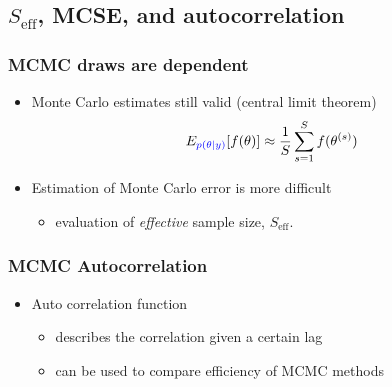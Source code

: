 \documentclass[10pt]{beamer}
\begin{document}
\subsection{$S_\text{eff}$, MCSE, and autocorrelation}


\begin{frame}

\frametitle{MCMC draws are dependent}

  \begin{itemize}
    \item Monte Carlo estimates still valid (central limit theorem)
      \begin{align*}
        E_{\color{blue} p(\theta|y)}[f(\theta)] \approx \frac{1}{S} \sum_{s=1}^S f(\theta^{(s)})
      \end{align*}
    \item Estimation of Monte Carlo error is more difficult
      \begin{itemize}
        \item evaluation of {\it effective} sample size, $S_\text{eff}$.
      \end{itemize}
    \end{itemize}
\end{frame}

\begin{frame}

\frametitle{MCMC Autocorrelation}

  \begin{itemize}
  \item Auto correlation function
    \begin{itemize}
    \item describes the correlation given a certain lag
    \item can be used to compare efficiency of MCMC methods
    \end{itemize}
  \end{itemize}
\end{frame}
\end{document}
